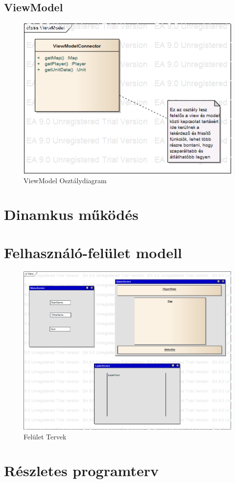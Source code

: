 \documentclass[a4paper,12pt]{report}
\begin{document}
\subsection{ViewModel}

\begin{figure}[hbtp]
\centering
\includegraphics[width=1\textwidth]{ViewModelClass.png}
\caption{ViewModel Osztálydiagram}
\label{fig:vmc}
\end{figure}

\section{Dinamkus működés}

\section{Felhasználó-felület modell}

\begin{figure}[hbtp]
\centering
\includegraphics[width=1\textwidth]{ViewScreen.png}
\caption{Felület Tervek}
\label{fig:vs}
\end{figure}

\section{Részletes programterv}
\end{document}
